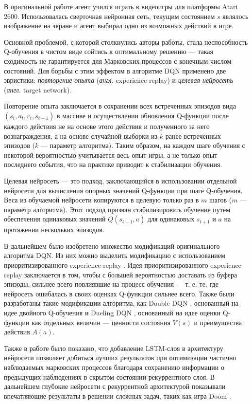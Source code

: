 \documentclass[specification,annotation,times]{itmo-student-thesis}
\theoremstyle{definition}
\begin{document}
В оригинальной работе агент учился играть в видеоигры для платформы Atari 2600.
Использовалась сверточная нейронная сеть, текущим состоянием $s$ являлось
изображение на экране и агент выбирал одно из возможных действий в игре.

Основной проблемой, с которой столкнулись авторы работы, стала неспособность
Q-обучения в чистом виде сойтись к оптимальному решению --- такая сходимость не
гарантируется для Марковских процессов с конечным числом состояний. Для борьбы с
этим эффектом в алгоритме DQN применено две эвристики: \textit{повторение опыта}
(\textit{англ.} experience replay) и \textit{целевая нейросеть} (\textit{англ.}
target network).

Повторение опыта заключается в сохранении всех встреченных эпизодов вида
$(s_t, a_t, r_t, s_{t+1})$ в массиве и осуществлении обновления Q-функции после
каждого действия не на основе этого действия и полученного за него
вознаграждения, а на основе случайной выборки из $k$ ранее встреченных эпизодов
($k$ --- параметр алгоритма). Таким образом, на каждом шаге обучения с некоторой
вероятностью учитывается весь опыт игры, а не только опыт последнего события,
что на практике приводит к стабилизации обучения.

Целевая нейросеть --- это подход, заключающийся в использовании отдельной
нейросети для вычисления опорных значений Q-функции при шаге Q-обучения. Веса из
обучаемой нейросети копируются в целевую только раз в $m$ шагов ($m$ ---
параметр алгоритма). Этот подход призван стабилизировать обучение путем
обеспечения одинаковых значений $Q(s_{t+1}, a)$ для одинаковых $s_{t+1}$ и $a$
на протяжении нескольких эпизодов.

В дальнейшем было изобретено множество модификаций оригинального алгоритма DQN.
Из них можно выделить модификацию с использованием приоритизированного
experience replay \cite{schaul2015prioritized}. Идея приоритизированного
experience replay заключается в том, чтобы с большей вероятностью доставать из
буфера эпизоды, сильнее всего повлиявшие на процесс обучения --- т. е. те,
где нейросеть ошибалась в своих оценках Q-функции сильнее всего.
Также были разработаны такие модификации алгоритма, как Double
DQN \cite{van2016deep}, основанный на идее двойного
Q-обучения \cite{hasselt2010double} и Dueling DQN \cite{wang2015dueling},
основанный на идее оценки Q-функции как отдельных величин --- ценности состояния
$V(s)$ и преимущества действия $A(a)$.

Также в работе \cite{hausknecht2015deep} было показано, что добавление
LSTM-слоя \cite{hochreiter1997long} в архитектуру нейросети позволяет добиться
лучших результатов при оптимизации частично наблюдаемых марковских процессов
благодаря сохранению информации о предыдущих наблюдениях в скрытом состоянии
рекуррентного слоя. В дальнейшем глубокие нейросети с рекуррентной архитектурой
показывали впечатляющие результаты в решении сложных задач, таких как игра
Doom \cite{lample2016playing}.
\end{document}
